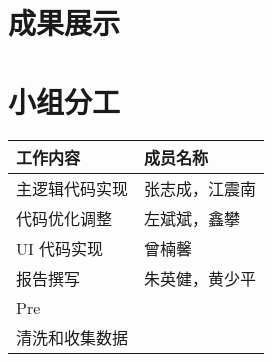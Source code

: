 \documentclass[12pt,hyperref,a4paper,UTF8]{ctexart}
\begin{document}
\section{成果展示}

\section{小组分工}
\begin{longtable}{>{\centering\arraybackslash}p{} >{\centering\arraybackslash}p{}} %
    \toprule
    \textbf{工作内容} & \textbf{成员名称} \\ %
    \midrule
    主逻辑代码实现 & 张志成，江震南 \\
    代码优化调整 & 左斌斌，鑫攀​ \\
    UI 代码实现 & 曾楠馨 \\
    报告撰写 & 朱英健，黄少平 \\
    Pre &  \\
    清洗和收集数据 &  \\
    \bottomrule
\end{longtable}


\end{document}
